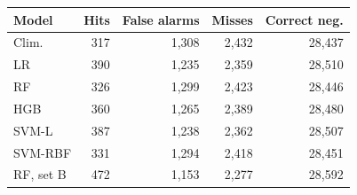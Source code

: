 \begin{tabular}{lrrrr}
\toprule
Model & Hits & False alarms & Misses & Correct neg. \\
\midrule
Clim. & 317 & 1,308 & 2,432 & 28,437 \\
LR & 390 & 1,235 & 2,359 & 28,510 \\
RF & 326 & 1,299 & 2,423 & 28,446 \\
HGB & 360 & 1,265 & 2,389 & 28,480 \\
SVM-L & 387 & 1,238 & 2,362 & 28,507 \\
SVM-RBF & 331 & 1,294 & 2,418 & 28,451 \\
RF, set B & 472 & 1,153 & 2,277 & 28,592 \\
\bottomrule
\end{tabular}
